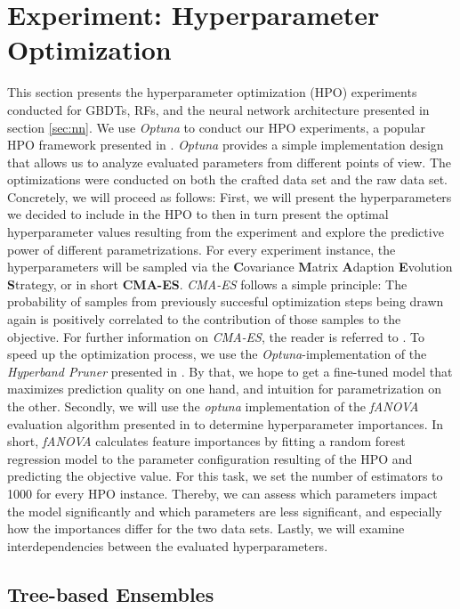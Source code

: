 \section{Experiment: Hyperparameter Optimization}\label{sec:hpo}
This section presents the hyperparameter optimization (HPO) experiments conducted for GBDTs, RFs, and the neural network architecture presented in section \ref{sec:nn}. 
We use \textit{Optuna} to conduct our HPO experiments, a popular HPO framework presented in \cite{akiba2019optuna}. 
\textit{Optuna} provides a simple implementation design that allows us to analyze evaluated parameters from different points of view. 
The optimizations were conducted on both the crafted data set and the raw data set. 
Concretely, we will proceed as follows: First, we will present the hyperparameters we decided to include in the HPO to then in turn present the optimal hyperparameter values resulting from the experiment and explore the predictive power of different parametrizations. 
For every experiment instance, the hyperparameters will be sampled via the \textbf{C}ovariance \textbf{M}atrix \textbf{A}daption \textbf{E}volution \textbf{S}trategy, or in short \textbf{CMA-ES}. \textit{CMA-ES} follows a simple principle: The probability of samples from previously succesful optimization steps being drawn again is positively correlated to the contribution of those samples to the objective. For further information on \textit{CMA-ES}, the reader is referred to \cite{hansen2016cma}. To speed up the optimization process, we use the \textit{Optuna}-implementation of the \textit{Hyperband Pruner} presented in \cite{li2018hyperband}. 
By that, we hope to get a fine-tuned model that maximizes prediction quality on one hand, and intuition for parametrization on the other.
Secondly, we will use the \textit{optuna} implementation of the \textit{fANOVA} evaluation algorithm presented in \cite{fANOVA} to determine hyperparameter importances. In short, \textit{fANOVA} calculates feature importances by fitting a random forest regression model to the parameter configuration resulting of the HPO and predicting the objective value. For this task, we set the number of estimators to 1000 for every HPO instance.
Thereby, we can assess which parameters impact the model significantly and which parameters are less significant, and especially how the importances differ for the two data sets. 
Lastly, we will examine interdependencies between the evaluated hyperparameters. 
 
\subsection{Tree-based Ensembles}

